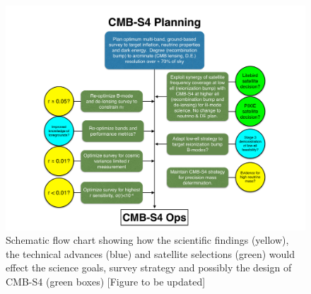 \begin{figure}[ht]
\centering \includegraphics[trim=1in 0in 1.2in 0in, clip, width=1.0\textwidth,]{Intro/Fig-FlowChart2_v1.pdf}
\caption{Schematic flow chart showing how the scientific findings (yellow), the technical advances (blue) and satellite selections (green) would effect the science goals, survey strategy and possibly the design of CMB-S4 (green boxes) [Figure to be updated] }
\label{fig:flowchart}
\end{figure}



%



